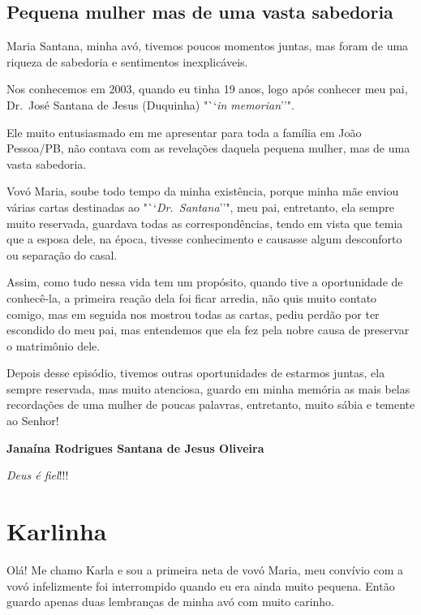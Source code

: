 \documentclass[
  brazil,
  a6paper,
  oneside,
  landscape,
  14pt]{scrbook}
\begin{document}
\hypertarget{pequena-mulher-mas-de-uma-vasta-sabedoria}{%
\subsection{Pequena mulher mas de uma vasta
sabedoria}\label{pequena-mulher-mas-de-uma-vasta-sabedoria}}

Maria Santana, minha avó, tivemos poucos momentos juntas, mas foram de
uma riqueza de sabedoria e sentimentos inexplicáveis.~

Nos conhecemos em 2003, quando eu tinha 19 anos, logo após conhecer meu
pai, Dr.~José Santana de Jesus (Duquinha) "``\emph{in memorian}''".

Ele muito entusiasmado em me apresentar para toda a família em João
Pessoa/PB, não contava com as revelações daquela pequena mulher, mas de
uma vasta sabedoria.

Vovó Maria, soube todo tempo da minha existência, porque minha mãe
enviou várias cartas destinadas ao "``\emph{Dr.~Santana}''", meu pai,
entretanto, ela sempre muito reservada, guardava todas as
correspondências, tendo em vista que temia que a esposa dele, na época,
tivesse conhecimento e causasse algum desconforto ou separação do casal.

Assim, como tudo nessa vida tem um propósito, quando tive a oportunidade
de conhecê-la, a primeira reação dela foi ficar arredia, não quis muito
contato comigo, mas em seguida nos mostrou todas as cartas, pediu perdão
por ter escondido do meu pai, mas entendemos que ela fez pela nobre
causa de preservar o matrimônio dele.

Depois desse episódio, tivemos outras oportunidades de estarmos juntas,
ela sempre reservada, mas muito atenciosa, guardo em minha memória as
mais belas recordações de uma mulher de poucas palavras, entretanto,
muito sábia e temente ao Senhor!

\textbf{Janaína Rodrigues Santana de Jesus Oliveira}

\emph{Deus é fiel}!!!

\hypertarget{karlinha}{%
\section{Karlinha}\label{karlinha}}

Olá! Me chamo Karla e sou a primeira neta de vovó Maria, meu convívio
com a vovó infelizmente foi interrompido quando eu era ainda muito
pequena. Então guardo apenas duas lembranças de minha avó com muito
carinho.
\end{document}
